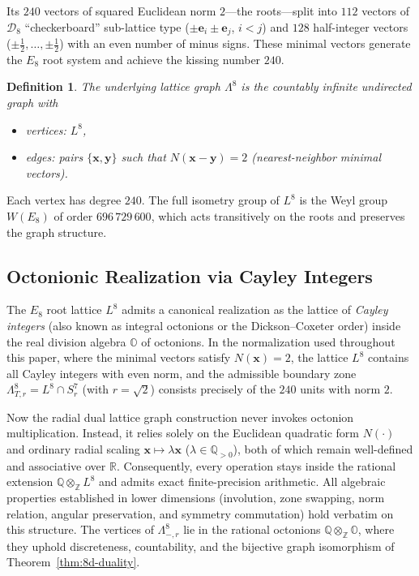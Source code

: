 \documentclass{article}
\newtheorem{definition}{Definition}
\begin{document}
Its $240$ vectors of squared Euclidean norm $2$---the roots---split into $112$ vectors of $\mathcal{D}_8$ ``checkerboard'' sub-lattice type ($\pm \mathbf{e}_i \pm \mathbf{e}_j$, $i<j$) and $128$ half-integer vectors ($\pm \tfrac{1}{2},\dots,\pm \tfrac{1}{2}$) with an even number of minus signs. These minimal vectors generate the $E_8$ root system and achieve the kissing number $240$.

\begin{definition}
\label{def:8d-lattice-graph}
The \emph{underlying lattice graph} $\Lambda^8$ is the countably infinite undirected graph with
\begin{itemize}
  \item vertices: $L^8$,
  \item edges: pairs $\{\mathbf{x}, \mathbf{y}\}$ such that $N(\mathbf{x} - \mathbf{y}) = 2$ (nearest-neighbor minimal vectors).
\end{itemize}
\end{definition}
Each vertex has degree $240$. The full isometry group of $L^8$ is the Weyl group $W(E_8)$ of order $696\,729\,600$, which acts transitively on the roots and preserves the graph structure.

\subsection{Octonionic Realization via Cayley Integers}
\label{subsec:8d-octonionic-realization}
The $E_8$ root lattice $L^8$ admits a canonical realization as the lattice of \emph{Cayley integers} (also known as integral octonions \cite{Baez2002} or the Dickson--Coxeter order) inside the real division algebra $\mathbb{O}$ of octonions. In the normalization used throughout this paper, where the minimal vectors satisfy $N(\mathbf{x}) = 2$, the lattice $L^8$ contains all Cayley integers with even norm, and the admissible boundary zone $\Lambda_{T,r}^8 = L^8 \cap S_r^7$ (with $r = \sqrt{2}$) consists precisely of the $240$ units with norm $2$.

Now the radial dual lattice graph construction never invokes octonion multiplication. Instead, it relies solely on the Euclidean quadratic form $N(\cdot)$ and ordinary radial scaling $\mathbf{x} \mapsto \lambda \mathbf{x}$ ($\lambda \in \mathbb{Q}_{>0}$), both of which remain well-defined and associative over \(\mathbb{R}\). Consequently, every operation stays inside the rational extension \(\mathbb{Q} \otimes_{\mathbb{Z}} L^8\) and admits exact finite-precision arithmetic. All algebraic properties established in lower dimensions (involution, zone swapping, norm relation, angular preservation, and symmetry commutation) hold verbatim on this structure. The vertices of \(\Lambda_{-,r}^8\) lie in the rational octonions \(\mathbb{Q} \otimes_{\mathbb{Z}} \mathbb{O}\), where they uphold discreteness, countability, and the bijective graph isomorphism of Theorem~\ref{thm:8d-duality}.
\end{document}
